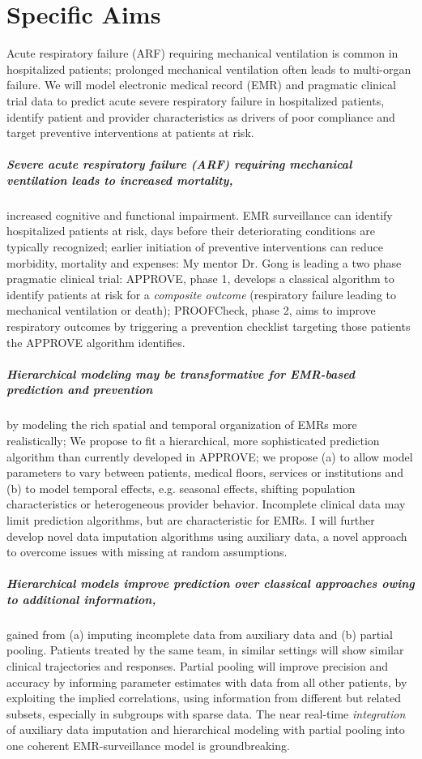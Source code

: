 \documentclass[11pt,notitlepage]{article}
\begin{document}
\section*{Specific Aims}
Acute respiratory failure (ARF) requiring mechanical ventilation is common in hospitalized patients; prolonged mechanical ventilation often leads to multi-organ failure. We will model electronic medical record (EMR) and pragmatic clinical trial data to predict acute severe respiratory failure in hospitalized patients, identify patient and provider characteristics as drivers of poor compliance and target preventive interventions at patients at risk.

\subparagraph{Severe acute respiratory failure (ARF) requiring mechanical ventilation leads to increased mortality,} increased cognitive and functional impairment. EMR surveillance can identify hospitalized patients at risk, days before their deteriorating conditions are typically recognized; earlier initiation of preventive interventions can reduce morbidity, mortality and expenses: My mentor Dr. Gong is leading a two phase pragmatic clinical trial: APPROVE, phase 1, develops a classical algorithm to identify patients at risk for a \textit{composite outcome} (respiratory failure leading to mechanical ventilation or death); PROOFCheck, phase 2, aims to improve respiratory outcomes by triggering a prevention checklist targeting those patients the APPROVE algorithm identifies. 

\subparagraph{Hierarchical modeling may be transformative for EMR-based prediction and prevention} by modeling the rich spatial and temporal organization of EMRs more realistically; We propose to fit a hierarchical, more sophisticated prediction algorithm than currently developed in APPROVE; we propose (a) to allow model parameters to vary between patients, medical floors, services or institutions and (b) to model temporal effects, e.g. seasonal effects, shifting population characteristics or heterogeneous provider behavior. Incomplete clinical data may limit prediction algorithms, but are characteristic for EMRs. I will further develop novel data imputation algorithms using auxiliary data, a novel approach to overcome issues with missing at random assumptions. 

\subparagraph{Hierarchical models improve prediction over classical approaches owing to additional information,} gained from (a) imputing incomplete data from auxiliary data and (b) partial pooling. Patients treated by the same team, in similar settings will show similar clinical trajectories and responses. Partial pooling will improve precision and accuracy by informing parameter estimates with data from all other patients,  by exploiting the implied correlations, using information from different but related subsets, especially in subgroups with sparse data. The near real-time \textit{integration} of auxiliary data imputation and hierarchical modeling with partial pooling into one coherent EMR-surveillance model is groundbreaking. 
\end{document}

